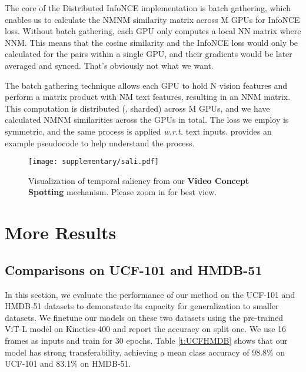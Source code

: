 \documentclass[10pt,twocolumn,letterpaper]{article}
\def\x{}
\begin{document}
The core of the Distributed InfoNCE implementation is batch gathering, which enables us to calculate the NM\x NM similarity matrix across M GPUs for InfoNCE loss. Without batch gathering, each GPU only computes a local N\x N matrix where NNM. This means that the cosine similarity and the InfoNCE loss would only be calculated for the pairs within a single GPU, and their gradients would be later averaged and synced. That's obviously not what we want.

The batch gathering technique allows each GPU to hold N vision features and perform a matrix product with NM text features, resulting in an N\x NM matrix. This computation is distributed (\ie, sharded) across M GPUs, and we have calculated NM\x NM similarities across the GPUs in total. The loss we employ is symmetric, and the same process is applied \emph{w.r.t.} text inputs.
 provides an example pseudocode to help understand the process.



\begin{figure*}
\begin{center}
\texttt{[image: supplementary/sali.pdf]}
\end{center}
\caption{Visualization of temporal saliency from our \textbf{Video Concept Spotting} mechanism. Please zoom in for best view.}
\label{fig:sali}
\end{figure*}


\section{More Results}\label{supp:video}


\subsection{Comparisons on UCF-101 and HMDB-51}\label{sec:small_sota}
In this section, we evaluate the performance of our method on the UCF-101 and HMDB-51 datasets to demonstrate its capacity for generalization to smaller datasets.
We finetune our models on these two datasets using the pre-trained ViT-L model on Kinetics-400 and report the accuracy on split one. We use 16 frames as inputs and train for 30 epochs.
Table \ref{t:UCFHMDB} shows that our model has strong transferability, achieving a mean class accuracy of 98.8\% on UCF-101 and 83.1\% on HMDB-51.
\end{document}
